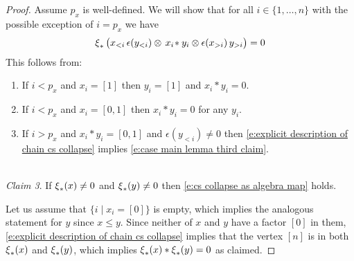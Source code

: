 \begin{proof}
	Assume $p_x$ is well-defined.
	We will show that for all $i \in \{1,\dots,n\}$ with the possible exception of $i = p_x$ we have
	\begin{equation} \label{e:case main lemma third claim}
	\operatorname{\xi}_\ast \big( x_{<i} \, \epsilon(y_{<i}) \otimes \, x_{i} \! \ast y_{i} \otimes \epsilon(x_{>i}) \, y_{>i} \big) = 0
	\end{equation}
	This follows from:
	\begin{enumerate}
		\item If $i < p_x$ and $x_i = [1]$ then $y_i = [1]$ and $x_i \ast y_i = 0$.
		\item If $i < p_x$ and $x_i = [0,1]$ then $x_i \ast y_i = 0$ for any $y_i$.
		\item If $i > p_x$ and $x_i \ast y_i = [0,1]$ and $\epsilon(y_{<i}) \neq 0$ then \eqref{e:explicit description of chain cs collapse} implies \eqref{e:case main lemma third claim}.
	\end{enumerate}

	\ \\ \noindent \textit{Claim 3}.
	If $\operatorname{\xi}_\ast(x) \neq 0$ and $\operatorname{\xi}_\ast(y) \neq 0$ then \eqref{e:cs collapse as algebra map} holds.

	Let us assume that $\big\{ i \mid x_i = [0] \big\}$ is empty, which implies the analogous statement for $y$ since $x \leq y$.
	Since neither of $x$ and $y$ have a factor $[0]$ in them, \eqref{e:explicit description of chain cs collapse} implies that the vertex $[n]$ is in both $\operatorname{\xi}_\ast(x)$ and $\operatorname{\xi}_\ast(y)$, which implies $\operatorname{\xi}_\ast(x) \ast \operatorname{\xi}_\ast(y) = 0$ as claimed.


\end{proof}
